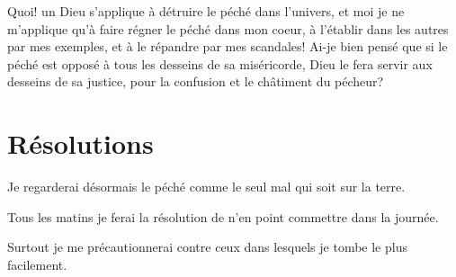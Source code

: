 \documentclass[instructions.tex]{subfiles}
\begin{document}
\secundo Quoi! un Dieu s'applique à détruire le péché dans l'univers, et moi je ne m'applique qu'à faire régner le péché dans mon coeur, à l'établir dans les autres par mes exemples, et à le répandre par mes scandales! Ai-je bien pensé que si le péché est opposé à tous les desseins de sa miséricorde, Dieu le fera servir aux desseins de sa justice, pour la confusion et le châtiment du pécheur?


\section{Résolutions}

Je regarderai désormais le péché comme le seul mal qui soit sur la terre.

\primo Tous les matins je ferai la résolution de n'en point commettre dans la journée.

\secundo Surtout je me précautionnerai contre ceux dans lesquels je tombe le plus facilement.

\end{document}
